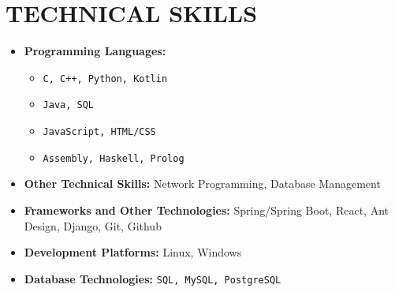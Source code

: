 \section{TECHNICAL SKILLS}

\begin{multicols}{2}
  \begin{itemize}[leftmargin=0.25in, itemsep=1pt]
    
    \item \textbf{Programming Languages:} 
      \begin{itemize}[label={-}, leftmargin=0.2in]
        \item \texttt{C, C++, Python, Kotlin}
        \item \texttt{Java, SQL}
        \item \texttt{JavaScript, HTML/CSS}
        \item \texttt{Assembly, Haskell, Prolog}
      \end{itemize}
      
    \item \textbf{Other Technical Skills:}
      Network Programming, Database Management
      
  \end{itemize}
  \vspace{\fill}
  \begin{itemize}[leftmargin=0.25in, itemsep=1pt]
    \item \textbf{Frameworks and Other Technologies:}
      Spring/Spring Boot, React, Ant Design, Django, Git, Github
    
    \item \textbf{Development Platforms:}
      Linux, Windows
    
    \item \textbf{Database Technologies:} 
      \texttt{SQL, MySQL, PostgreSQL}
  \end{itemize}
\end{multicols}
